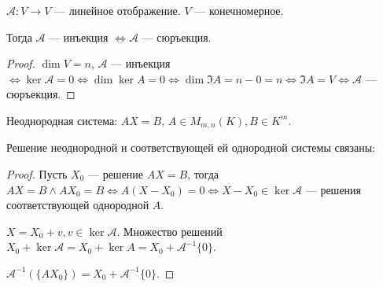 \begin{theorem}
    $\mathcal{A}\!: V \to V$ --- линейное отображение.  $V$ --- конечномерное.

    Тогда  $\mathcal{A}$ --- инъекция  $\iff \mathcal{A}$ --- сюръекция.
\end{theorem}
\begin{proof}
    $\dim V = n$,  $\mathcal{A}$ --- инъекция  $\iff \ker \mathcal{A} = 0 \iff \dim \ker A = 0 \iff \dim \Im A = n - 0 = n \iff \Im A = V \iff \mathcal{A}$ --- сюръекция.
\end{proof}

\begin{definition}
    Неоднородная система: $AX=B$,  $A \in M_{m, n}(K), B \in K^m$.
\end{definition}
\begin{theorem}
    Решение неоднородной и соответствующей ей однородной системы связаны:

\end{theorem}
\begin{proof}
    Пусть $X_0$ --- решение $AX=B$, тогда  $AX=B \land AX_0=B \iff A(X-X_0) = 0 \iff X - X_0 \in \ker \mathcal{A}$ --- решения соответствующей однородной $A$.

    $X = X_0 + v, v \in \ker \mathcal{A} $. Множество решений $X_0 + \ker \mathcal{A} = X_0 + \ker A = X_0 + \mathcal{A}^{-1}\{0\}$.

    $\mathcal{A}^{-1}(\{A X_0\}) = X_0 + \mathcal{A}^{-1}\{0\}$.
\end{proof}

